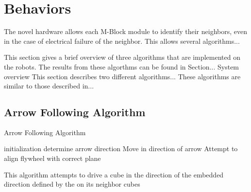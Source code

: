 \section{Behaviors}
\label{sec:Behaviors}

The novel hardware allows each M-Block module to identify their neighbors, even in the case of electrical failure of the
neighbor. This allows several algorithms...


This section gives a brief overview of three algorithms that are implemented on the robots. The results from these algorthms can be found in Section...
System overview
This section describes two different algorithms... These algorithms are similar to those described in...

\subsection{Arrow Following Algorithm}
\label{sec:algArrow}

%
	
\begin{algorithm}[ht] 
	\caption{Arrow Following Algorithm}
	\label{algorithmArrow}
	\SetAlgoLined
	initialization\;
	{
		determine arrow direction\;
		{
			Move in direction of arrow\;
		}
		{
			 Attempt to align flywheel with correct plane\;
		}
	}
	\caption{This algorithm attempts to drive a cube in the direction of the embedded direction defined by the \tagName on its neighbor cubes}

\end{algorithm}



